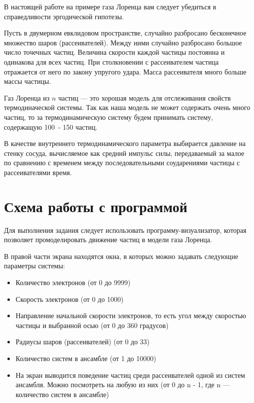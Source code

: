 \documentclass[12pt,a4paper]{scrartcl}
\begin{document}
	В настоящей работе на примере газа Лоренца вам следует убедиться в справедливости эргодической гипотезы.
	
	Пусть в двумерном евклидовом пространстве, случайно разбросано бесконечное множество шаров (рассеивателей). Между ними случайно разбросано большое число точечных частиц. Величина скорости каждой частицы постоянна и одинакова для всех частиц. При столкновении с рассеивателем частица отражается от него по закону упругого удара. Масса рассеивателя много больше массы частицы. 
	
	Газ Лоренца из $n$ частиц --- это хорошая модель для отслеживания свойств термодиначеской системы. Так как наша модель не может содержать очень много частиц, то за термодинамическую систему будем принимать систему, содержащую 100\ - 150 частиц.
	
	В качестве внутреннего термодинамического параметра выбирается давление на стенку сосуда, вычисляемое как средний импульс силы, передаваемый за малое по сравнению с временем между последовательными соударениями частицы с рассеивателями время.
    
\section{Схема работы с программой}
        
        Для выполнения задания следует использовать программу-визуализатор, которая позволяет промоделировать движение частиц в модели газа Лоренца.

    В правой части экрана находятся окна, в которых можно задавать следующие параметры системы:

    \begin{itemize}
    	\item Количество электронов (от 0 до 9999)
        \item Скорость электронов (от 0 до 1000)
        \item Направление начальной скорости электронов, то есть угол между скоростью частицы и выбранной осью (от 0 до 360 градусов)
        \item Радиусы шаров (рассеивателей) (от 0 до 33)
        \item Количество систем в ансамбле (от 1 до 10000)
		\item На экран выводится поведение частиц среди рассеивателей одной из систем ансамбля. Можно посмотреть на любую из них (от 0 до n - 1, где n --- количество систем в ансамбле)
    \end{itemize}
\end{document}
